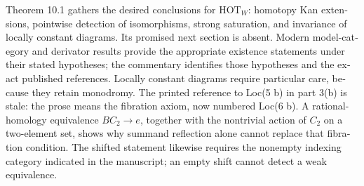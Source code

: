 \begin{otherlanguage}{english}
\begin{otherlanguage}{english}
Theorem 10.1 gathers the desired conclusions for $\mathrm{HOT}_W$: homotopy Kan extensions, pointwise detection of isomorphisms, strong saturation, and invariance of locally constant diagrams. Its promised next section is absent. Modern model-category and derivator results provide the appropriate existence statements under their stated hypotheses; the commentary identifies those hypotheses and the exact published references. Locally constant diagrams require particular care, because they retain monodromy. The printed reference to Loc(5 b) in part 3(b) is stale: the prose means the fibration axiom, now numbered Loc(6 b). A rational-homology equivalence $BC_2\to e$, together with the nontrivial action of $C_2$ on a two-element set, shows why summand reflection alone cannot replace that fibration condition. The shifted statement likewise requires the nonempty indexing category indicated in the manuscript; an empty shift cannot detect a weak equivalence.



\end{otherlanguage}
\end{otherlanguage}
\dgrchunkend
